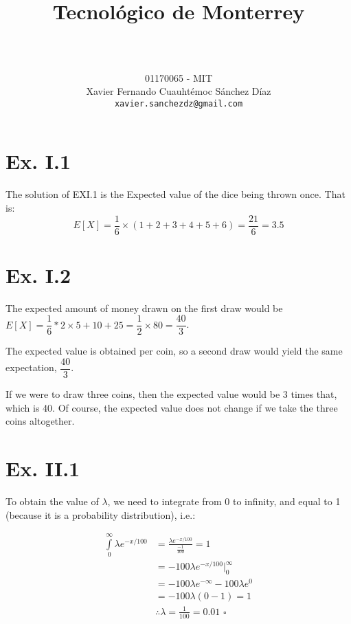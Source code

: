 \documentclass[titlepage, letterpaper]{article}
\title{
\vspace{1in}
\textbf{Tecnológico de Monterrey} \\
\vspace{0.5in}
\textmd{\mahclass} \\
\vspace{0.5in}
\textsc{\mahtitle}
\author{01170065  - MIT \\
Xavier Fernando Cuauhtémoc Sánchez Díaz \\
\texttt{xavier.sanchezdz@gmail.com}}
\date{\mahdate}
}
\newcommand{\qed}{\,\,\square}
\begin{document}
\begin{titlepage}
    \maketitle
\end{titlepage}

%
%

\section{Ex. I.1} %
\label{sec:exercise_i_1}

The solution of EXI.1 is the Expected value of the dice being thrown once.
That is:
$$E[X] = \frac{1}{6} \times (1+2+3+4+5+6) = \frac{21}{6} = 3.5$$


\section{Ex. I.2} %
\label{sec:ex_i_2}

The expected amount of money drawn on the first draw would be $E[X] = \dfrac{1}{6} * 2 \times 5+10+25 = \dfrac{1}{2} \times 80 = \dfrac{40}{3}$.

The expected value is obtained per coin, so a second draw would yield the same expectation, $\dfrac{40}{3}$.

If we were to draw three coins, then the expected value would be 3 times that, which is 40.
Of course, the expected value does not change if we take the three coins altogether.


\section{Ex. II.1} %
\label{sec:ex_ii_1}

To obtain the value of $\lambda$, we need to integrate from 0 to infinity, and equal to 1 (because it is a probability distribution), i.e.:

\begin{align}
    \int\limits_0^\infty \lambda e^{-x/100} & = \frac{\lambda e^{-x/100}}{\tfrac{-1}{100}} = 1 \\
    & = -100\lambda e^{-x/100}\Big|_0^\infty \\[3ex]
    & = -100\lambda e^{-\infty} - 100\lambda e^0 \\
    & = -100\lambda (0 - 1) = 1 \\
    & \therefore \lambda = \frac{1}{100} = 0.01 \qed
\end{align}
\end{document}
